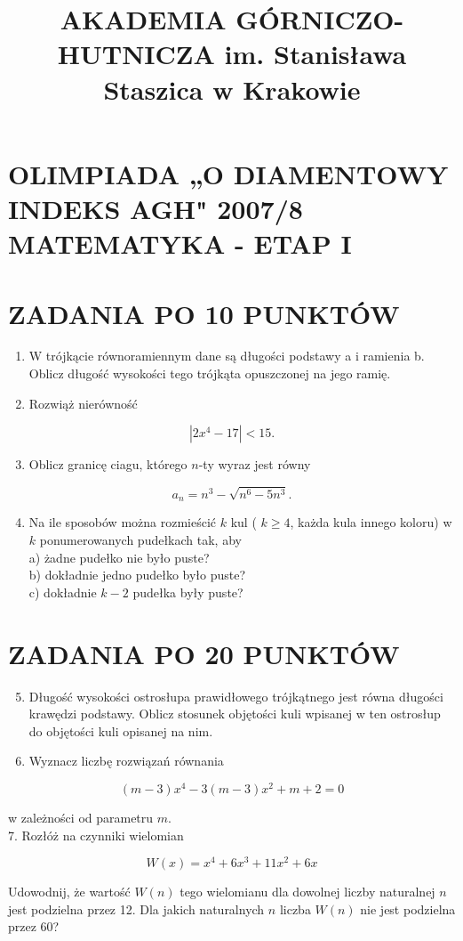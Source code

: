 \documentclass[10pt]{article}
\title{AKADEMIA GÓRNICZO-HUTNICZA im. Stanisława Staszica w Krakowie }
\author{}
\date{}
\begin{document}
\maketitle
\section*{OLIMPIADA „O DIAMENTOWY INDEKS AGH" 2007/8 MATEMATYKA - ETAP I}
\section*{ZADANIA PO 10 PUNKTÓW}
\begin{enumerate}
  \item W trójkącie równoramiennym dane są długości podstawy a i ramienia b. Oblicz długość wysokości tego trójkąta opuszczonej na jego ramię.
  \item Rozwiąż nierówność
\end{enumerate}

$$
\left|2 x^{4}-17\right|<15 .
$$

\begin{enumerate}
  \setcounter{enumi}{2}
  \item Oblicz granicę ciagu, którego $n$-ty wyraz jest równy
\end{enumerate}

$$
a_{n}=n^{3}-\sqrt{n^{6}-5 n^{3}} .
$$

\begin{enumerate}
  \setcounter{enumi}{3}
  \item Na ile sposobów można rozmieścić $k$ kul ( $k \geq 4$, każda kula innego koloru) w $k$ ponumerowanych pudełkach tak, aby\\
a) żadne pudełko nie było puste?\\
b) dokładnie jedno pudełko było puste?\\
c) dokładnie $k-2$ pudełka były puste?
\end{enumerate}

\section*{ZADANIA PO 20 PUNKTÓW}
\begin{enumerate}
  \setcounter{enumi}{4}
  \item Długość wysokości ostrosłupa prawidłowego trójkątnego jest równa długości krawędzi podstawy. Oblicz stosunek objętości kuli wpisanej w ten ostrosłup do objętości kuli opisanej na nim.
  \item Wyznacz liczbę rozwiązań równania
\end{enumerate}

$$
(m-3) x^{4}-3(m-3) x^{2}+m+2=0
$$

w zależności od parametru $m$.\\
7. Rozłóż na czynniki wielomian

$$
W(x)=x^{4}+6 x^{3}+11 x^{2}+6 x
$$

Udowodnij, że wartość $W(n)$ tego wielomianu dla dowolnej liczby naturalnej $n$ jest podzielna przez 12. Dla jakich naturalnych $n$ liczba $W(n)$ nie jest podzielna przez 60?
\end{document}
